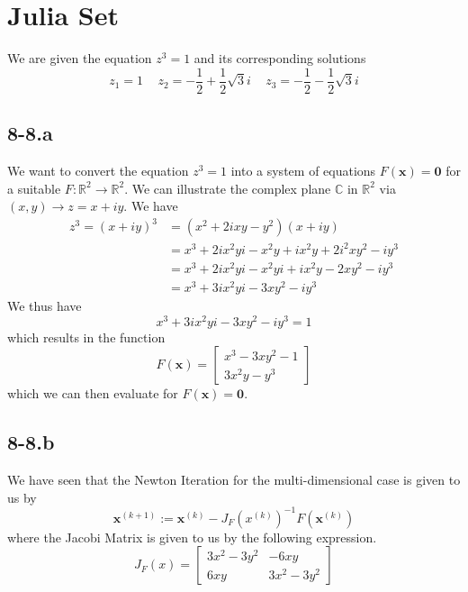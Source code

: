 \documentclass{article}
\begin{document}
\section*{Julia Set}
 We are given the equation $z^{3} = 1$ and its corresponding solutions
\begin{equation*}
    z_{1} = 1\, \quad z_{2} = -\frac{1}{2} + \frac{1}{2}\sqrt{3}i\, \quad z_{3} = -\frac{1}{2} -\frac{1}{2}\sqrt{3}i
\end{equation*}
\subsection*{8-8.a}
We want to convert the equation $z^{3} = 1$ into a system of equations $F\left(\mathbf{x}\right) = \mathbf{0}$ for a suitable $F : \mathbb{R}^{2} \to \mathbb{R}^{2}$. We can illustrate the complex plane $\mathbb{C}$ in $\mathbb{R}^{2}$ via $\left(x,y\right) \to z = x + iy$. We have 
\begin{align*}
    z^{3} = \left(x+iy\right)^{3} &=  \left(x^{2} + 2ixy -y^{2}\right)\left(x +iy\right)\\ 
    &= x^{3} + 2ix^{2}yi -x^{2}y + ix^{2}y + 2i^{2}xy^{2} -iy^{3} \\
    &=x^{3} + 2ix^{2}yi -x^{2}yi + ix^{2}y -2xy^{2} -iy^{3} \\
    &=x^{3} + 3ix^{2}yi -3xy^{2} -iy^{3}
\end{align*}
We thus have 
\begin{equation*}
    x^{3} + 3ix^{2}yi -3xy^{2} -iy^{3} = 1
\end{equation*}
which results in the function
\begin{equation*}
    F\left(\mathbf{x}\right) = \begin{bmatrix}
        x^{3} - 3xy^{2} - 1 \\
        3x^{2}y - y^{3}
    \end{bmatrix}
\end{equation*}
which we can then evaluate for $F\left(\mathbf{x}\right) = \mathbf{0}$.
\subsection*{8-8.b}
We have seen that the Newton Iteration for the multi-dimensional case is given to us by
\begin{equation*}
    \mathbf{x}^{\left(k+1\right)} := \mathbf{x}^{\left(k\right)} - J_{F}\left(x^{\left(k\right)}\right)^{-1}F\left(\mathbf{x}^{\left(k\right)}\right)
\end{equation*}
where the Jacobi Matrix is given to us by the following expression.
\begin{equation*}
J_{F}\left(x\right) = \begin{bmatrix}
    3x^{2} - 3y^{2} & -6xy \\
    6xy & 3x^{2} - 3y^{2}
    \end{bmatrix}
\end{equation*}
\end{document}
